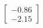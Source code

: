 \documentclass[preview]{standalone}
\begin{document}
\begin{align*}
\begin{bmatrix} -0.86 \\ -2.15 \end{bmatrix}
\end{align*}
\end{document}
